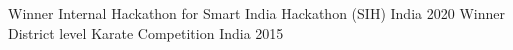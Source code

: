 


\begin{cvhonors}

  \cvhonor
    {Winner} %
    {Internal Hackathon for Smart India Hackathon (SIH)} %
    {India} %
    {2020} %
  \cvhonor
    {Winner} %
    {District level Karate Competition} %
    {India} %
    {2015} %
\end{cvhonors}